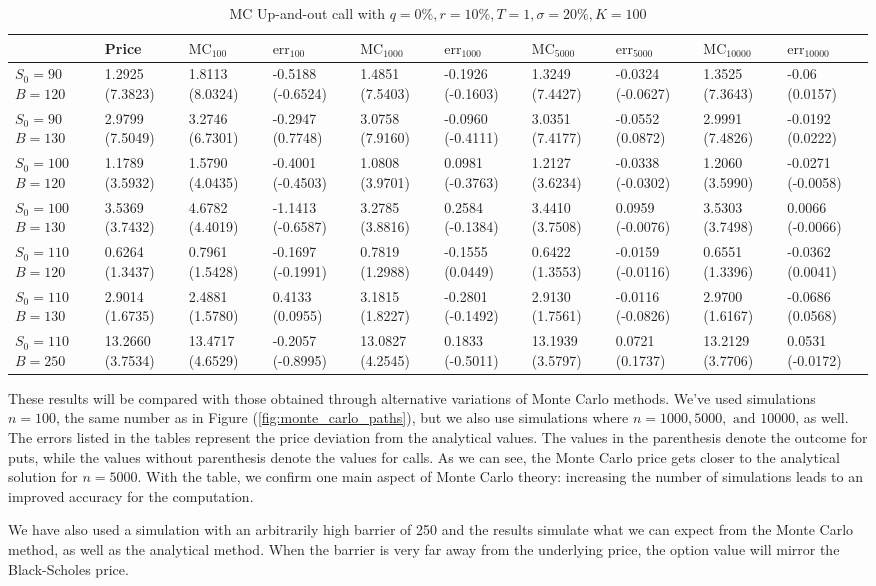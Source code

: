 \begin{center}
	\begin{table}[H]
		\begin{tabular}{ | m{4em} | m{1.4cm}| m{1.4cm} | m{1.4cm}| m{1.4cm} | m{1.37cm} | m{1.4cm} | m{1.4cm} | m{1.4cm} | m{1.45cm} |} 
			\hline
			& Price & $\text{MC}_{100}$ & $\text{err}_{100}$ & $\text{MC}_{1000}$ & $\text{err}_{1000}$ & $\text{MC}_{5000}$ & $\text{err}_{5000}$ & $\text{MC}_{10000}$ & $\text{err}_{10000}$  \\ 
			\hline
			$S_0=90$ $B=120$ & 1.2925 (7.3823) & 1.8113 (8.0324)  & -0.5188 (-0.6524) & 1.4851 (7.5403) & -0.1926 (-0.1603) & 1.3249 (7.4427) & -0.0324 (-0.0627) & 1.3525 (7.3643) & -0.06 (0.0157) \\ 
			\hline
			$S_0=90$ $B=130$ & 2.9799 (7.5049) & 3.2746 (6.7301) & -0.2947 (0.7748) & 3.0758 (7.9160) & -0.0960 (-0.4111) &  3.0351 (7.4177) & -0.0552 (0.0872) & 2.9991 (7.4826) & -0.0192 (0.0222) \\ 
			\hline
			$S_0=100$ $B=120$ & 1.1789 (3.5932) & 1.5790 (4.0435) & -0.4001 (-0.4503) & 1.0808 (3.9701)  & 0.0981 (-0.3763) & 1.2127 (3.6234) & -0.0338 (-0.0302) & 1.2060 (3.5990) & -0.0271 (-0.0058) \\ 
			\hline
			$S_0=100$ $B=130$ & 3.5369 (3.7432) & 4.6782 (4.4019)  & -1.1413 (-0.6587) & 3.2785 (3.8816) & 0.2584 (-0.1384) & 3.4410 (3.7508) & 0.0959 (-0.0076) & 3.5303 (3.7498)  & 0.0066 (-0.0066)\\ 
			\hline 
			$S_0=110$ $B=120$ & 0.6264 (1.3437) & 0.7961 (1.5428) & -0.1697 (-0.1991) & 0.7819 (1.2988) & -0.1555 (0.0449) & 0.6422 (1.3553) & -0.0159 (-0.0116) & 0.6551 (1.3396) & -0.0362 (0.0041) \\
			\hline
			$S_0=110$ $B=130$ & 2.9014 (1.6735) & 2.4881 (1.5780)  & 0.4133 (0.0955) & 3.1815 (1.8227) & -0.2801 (-0.1492) & 2.9130 (1.7561) & -0.0116 (-0.0826) & 2.9700 (1.6167) & -0.0686 (0.0568)\\
			\hline
			$S_0=110$ $B=250$ & 13.2660 (3.7534) & 13.4717 (4.6529)  & -0.2057 (-0.8995) & 13.0827 (4.2545) & 0.1833 (-0.5011) & 13.1939 (3.5797) & 0.0721 (0.1737) & 13.2129 (3.7706) & 0.0531 (-0.0172)\\
			\hline
		\end{tabular}
		\caption{MC Up-and-out call with $q=0\%,r=10\%, T=1,\sigma=20\%,K=100$}
		\label{tab:MC_barrer}
	\end{table}
\end{center}

These results will be compared with those obtained through alternative variations of Monte Carlo methods. We've used simulations $n=100$, the same number as in Figure (\ref{fig:monte_carlo_paths}), but we also use simulations where $n=1000,5000,\text{ and }10000$, as well. The errors listed in the tables represent the price deviation from the analytical values. The values in the parenthesis denote the outcome for puts, while the values without parenthesis denote the values for calls. As we can see, the Monte Carlo price gets closer to the analytical solution for $n=5000$. With the table, we confirm one main aspect of Monte Carlo theory: increasing the number of simulations leads to an improved accuracy for the computation. 

We have also used a simulation with an arbitrarily high barrier of 250 and the results simulate what we can expect from the Monte Carlo method, as well as the analytical method. When the barrier is very far away from the underlying price, the option value will mirror the Black-Scholes price.
